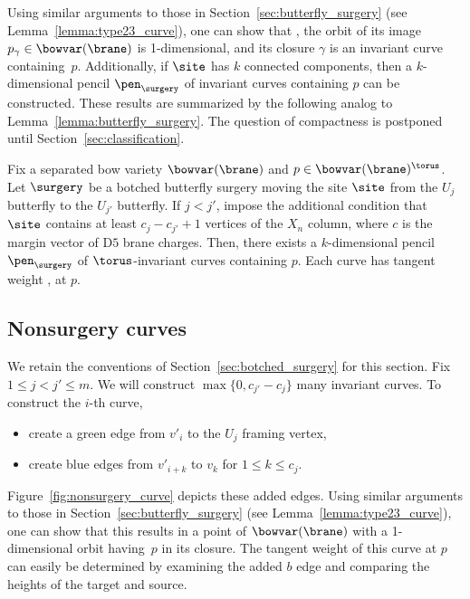 Using similar arguments to those in Section~\ref{sec:butterfly_surgery} (see Lemma~\ref{lemma:type23_curve}), one can show that , the orbit of its image $p_\gamma \in \bowvar(\brane)$ is 1-dimensional, and its closure $\gamma$ is an invariant curve containing~$p$. Additionally, if $\site$ has $k$ connected components, then a $k$-dimensional pencil $\pen_\surgery$ of invariant curves containing $p$ can be constructed. These results are summarized by the following analog to Lemma~\ref{lemma:butterfly_surgery}. The question of compactness is postponed until Section~\ref{sec:classification}.

\begin{Lemma} \label{lemma:botched_surgery}
Fix a separated bow variety $\bowvar(\brane)$ and $p\in \bowvar(\brane)^\torus$. Let $\surgery$ be a botched butterfly surgery moving the site $\site$ from the $U_j$ butterfly to the $U_{j'}$ butterfly. If $j < j'$, impose the additional condition that $\site$ contains at least $c_j - c_{j'} + 1$ vertices of the $X_n$ column, where $c$ is the margin vector of D$5$ brane charges. Then, there exists a $k$-dimensional pencil $\pen_\surgery$ of $\torus$-invariant curves containing $p$. Each curve has tangent weight
,
at $p$.
\end{Lemma}


\subsection{Nonsurgery curves} \label{sec:nonsurgery}
We retain the conventions of Section~\ref{sec:botched_surgery} for this section. Fix $1\leq j < j' \leq m$. We will construct $\max\{0, c_{j'} - c_j\}$ many invariant curves. To construct the $i$-th curve,
\begin{itemize}\itemsep=0pt
\item create a green edge from $v'_i$ to the $U_j$ framing vertex,
\item create blue edges from $v'_{i+k}$ to $v_k$ for $1 \leq k \leq c_j$.
\end{itemize}
Figure~\ref{fig:nonsurgery_curve} depicts these added edges. Using similar arguments to those in Section~\ref{sec:butterfly_surgery} (see Lemma~\ref{lemma:type23_curve}), one can show that this results in a point of $\bowvar(\brane)$ with a 1-dimensional orbit having~$p$ in its closure. The tangent weight of this curve at $p$ can easily be determined by examining the added $b$ edge and comparing the heights of the target and source.

